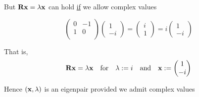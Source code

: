 \begin{frame}
    
    \vspace{2em}
    But $\mathbf R {\mathbf x} = \lambda {\mathbf x}$ can hold \underline{if} we allow
    complex values

    \vspace{1em}

    \Eg 
    \begin{equation*}
        \left(
        \begin{array}{cc}
            0 & -1  \\
            1 & 0  \\
        \end{array}
        \right)
        \begin{pmatrix}
            1 \\
            -i
        \end{pmatrix}
        =
        \begin{pmatrix}
            i \\
            1
        \end{pmatrix}
        =
        i
        \begin{pmatrix}
            1 \\
            -i
        \end{pmatrix}
    \end{equation*}

    \vspace{.7em}
    That is,
    \begin{equation*}
        \mathbf R {\mathbf x} = \lambda {\mathbf x}
        \quad \text{for} \quad
        \lambda := i
        \quad \text{and} \quad
        {\mathbf x} := 
        \begin{pmatrix}
            1 \\
            -i
        \end{pmatrix}
    \end{equation*}


    Hence $({\mathbf x}, \lambda)$ is an eigenpair provided 
    we admit complex values 

\end{frame}

